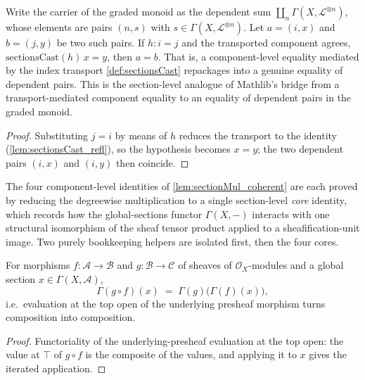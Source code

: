\begin{lemma}
  \label{lem:gradedMonoid_eq_of_cast}
  Write the carrier of the graded monoid as the dependent sum
  \(\coprod_{n} \Gamma(X, \mathcal{L}^{\otimes n})\), whose elements are pairs
  \((n, s)\) with \(s \in \Gamma(X, \mathcal{L}^{\otimes n})\). Let
  \(a = (i, x)\) and \(b = (j, y)\) be two such pairs. If \(h : i = j\) and the
  transported component agrees, \(\mathrm{sectionsCast}(h)\,x = y\), then
  \(a = b\). That is, a component-level equality mediated by the index transport
  \cref{def:sectionsCast} repackages into a genuine equality of dependent pairs.
  This is the section-level analogue of Mathlib's bridge from a transport-mediated
  component equality to an equality of dependent pairs in the graded monoid.
\end{lemma}

\begin{proof}
  Substituting \(j = i\) by means of \(h\) reduces the transport to the identity
  (\cref{lem:sectionsCast_refl}), so the hypothesis becomes \(x = y\); the two
  dependent pairs \((i, x)\) and \((i, y)\) then coincide.
\end{proof}

The four component-level identities of \cref{lem:sectionMul_coherent} are each
proved by reducing the degreewise multiplication to a single section-level
\emph{core} identity, which records how the global-sections functor
\(\Gamma(X,-)\) interacts with one structural isomorphism of the sheaf tensor
product applied to a sheafification-unit image. Two purely bookkeeping helpers
are isolated first, then the four cores.

\begin{lemma}
  \label{lem:val_app_top_comp}
  For morphisms \(f : \mathcal{A} \to \mathcal{B}\) and
  \(g : \mathcal{B} \to \mathcal{C}\) of sheaves of \(\mathcal{O}_X\)-modules and a
  global section \(x \in \Gamma(X, \mathcal{A})\),
  \[
    \Gamma(g \circ f)(x) \;=\; \Gamma(g)\bigl(\Gamma(f)(x)\bigr),
  \]
  i.e.\ evaluation at the top open of the underlying presheaf morphism turns
  composition into composition.
\end{lemma}

\begin{proof}


  Functoriality of the underlying-presheaf evaluation at the top open: the
  value at \(\top\) of \(g \circ f\) is the composite of the values, and applying
  it to \(x\) gives the iterated application.
\end{proof}

